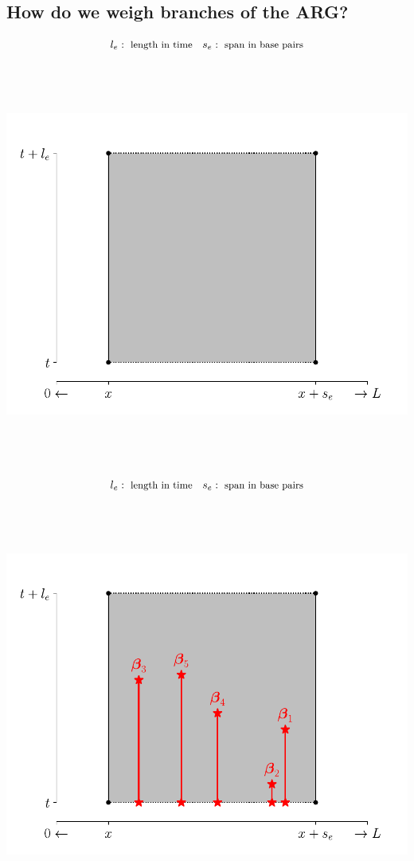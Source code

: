 \documentclass[
  letterpaper,
  DIV=11,
  numbers=noendperiod]{scrartcl}
\begin{document}
\subsection{How do we weigh branches of the
ARG?}\label{how-do-we-weigh-branches-of-the-arg}

\[
\small l_e:\text{ length in time} \quad s_e:\text{ span in base pairs}
\] \begin{center}
\includegraphics[width=\linewidth,height=5.20833in,keepaspectratio]{slides_files/mediabag/imgs/edge_weight-0.pdf}
\end{center}

\[
\small l_e:\text{ length in time} \quad s_e:\text{ span in base pairs}
\] \begin{center}
\includegraphics[width=\linewidth,height=5.20833in,keepaspectratio]{slides_files/mediabag/imgs/edge_weight-1.pdf}
\end{center}
\end{document}
